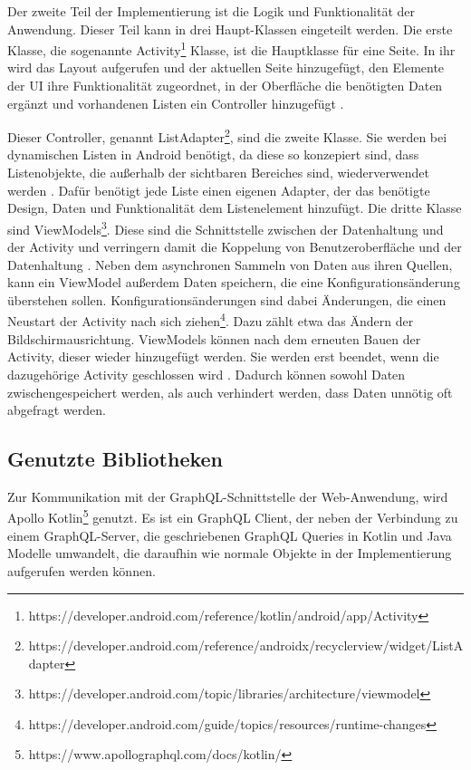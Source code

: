 Der zweite Teil der Implementierung ist die Logik und Funktionalität der Anwendung. Dieser Teil kann in drei Haupt-Klassen eingeteilt werden. 
Die erste Klasse, die sogenannte Activity\footnote{https://developer.android.com/reference/kotlin/android/app/Activity} Klasse, ist die Hauptklasse für eine Seite. In ihr wird das Layout aufgerufen und der aktuellen Seite hinzugefügt, den Elemente der UI ihre Funktionalität zugeordnet, in der Oberfläche die benötigten Daten ergänzt und vorhandenen Listen ein Controller hinzugefügt \cite{sarkar_android}.

Dieser Controller, genannt ListAdapter\footnote{https://developer.android.com/reference/androidx/recyclerview/widget/ListAdapter}, sind die zweite Klasse. Sie werden bei dynamischen Listen in Android benötigt, da diese so konzepiert sind, dass Listenobjekte, die außerhalb der sichtbaren Bereiches sind, wiederverwendet werden \cite{recyclerview_android}. Dafür benötigt jede Liste einen eigenen Adapter, der das benötigte Design, Daten und Funktionalität dem Listenelement hinzufügt.
Die dritte Klasse sind ViewModels\footnote{https://developer.android.com/topic/libraries/architecture/viewmodel}. Diese sind die Schnittstelle zwischen der Datenhaltung und der Activity und verringern damit die Koppelung von Benutzeroberfläche und der Datenhaltung \cite{viewModel_android}. Neben dem asynchronen Sammeln von Daten aus ihren Quellen, kann ein ViewModel außerdem Daten speichern, die eine Konfigurationsänderung überstehen sollen. Konfigurationsänderungen sind dabei Änderungen, die einen Neustart der Activity nach sich ziehen\footnote{https://developer.android.com/guide/topics/resources/runtime-changes}. Dazu zählt etwa das Ändern der Bildschirmausrichtung. ViewModels können nach dem erneuten Bauen der Activity, dieser wieder hinzugefügt werden. Sie werden erst beendet, wenn die dazugehörige Activity geschlossen wird \cite{Android_Room}. Dadurch können sowohl Daten zwischengespeichert werden, als auch verhindert werden, dass Daten unnötig oft abgefragt werden.


\subsection{Genutzte Bibliotheken}
\label{cha:4_1_bibliothek}
Zur Kommunikation mit der GraphQL-Schnittstelle der Web-Anwendung, wird Apollo Kotlin\footnote{https://www.apollographql.com/docs/kotlin/} genutzt. 
Es ist ein GraphQL Client, der neben der Verbindung zu einem GraphQL-Server, die geschriebenen GraphQL Queries in Kotlin und Java Modelle umwandelt, die daraufhin wie normale Objekte in der Implementierung aufgerufen werden können.

